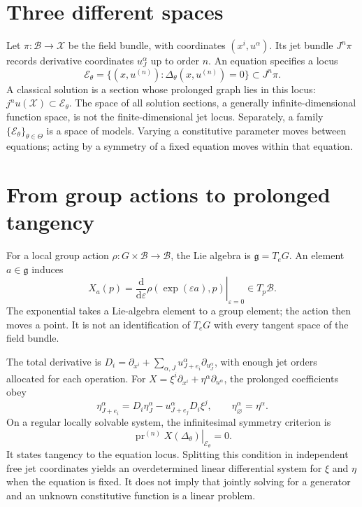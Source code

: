 \documentclass[11pt,a4paper,oneside]{report}
\numberwithin{equation}{chapter}
\newcommand{\E}{\mathcal E}
\newcommand{\dd}{\mathrm d}
\newcommand{\pr}{\operatorname{pr}}
\begin{document}
\section{Three different spaces}
Let $\pi:\mathcal B\to\mathcal X$ be the field bundle, with coordinates $(x^i,u^\alpha)$. Its jet bundle $J^n\pi$ records derivative coordinates $u^\alpha_J$ up to order $n$. An equation specifies a locus
\begin{equation}
\E_\theta=\{(x,u^{(n)}):\Delta_\theta(x,u^{(n)})=0\}\subset J^n\pi.
\end{equation}
A classical solution is a section whose prolonged graph lies in this locus: $j^nu(\mathcal X)\subset\E_\theta$. The space of all solution sections, a generally infinite-dimensional function space, is not the finite-dimensional jet locus. Separately, a family $\{\E_\theta\}_{\theta\in\Theta}$ is a space of models. Varying a constitutive parameter moves between equations; acting by a symmetry of a fixed equation moves within that equation.

\section{From group actions to prolonged tangency}
For a local group action $\rho:G\times\mathcal B\to\mathcal B$, the Lie algebra is $\mathfrak g=T_eG$. An element $a\in\mathfrak g$ induces
\begin{equation}
X_a(p)=\left.\frac{\dd}{\dd\varepsilon}\rho(\exp(\varepsilon a),p)\right|_{\varepsilon=0}\in T_p\mathcal B.
\end{equation}
The exponential takes a Lie-algebra element to a group element; the action then moves a point. It is not an identification of $T_eG$ with every tangent space of the field bundle.



The total derivative is $D_i=\partial_{x^i}+\sum_{\alpha,J}u^\alpha_{J+e_i}\partial_{u^\alpha_J}$, with enough jet orders allocated for each operation. For $X=\xi^i\partial_{x^i}+\eta^\alpha\partial_{u^\alpha}$, the prolonged coefficients obey
\begin{equation}\label{eq:prolong}
\eta^\alpha_{J+e_i}=D_i\eta^\alpha_J-u^\alpha_{J+e_j}D_i\xi^j,
\qquad \eta^\alpha_\varnothing=\eta^\alpha.
\end{equation}
On a regular locally solvable system, the infinitesimal symmetry criterion is \cite{olver1986,oliveri2026}
\begin{equation}\label{eq:criterion}
\left.\pr^{(n)}X(\Delta_\theta)\right|_{\E_\theta}=0.
\end{equation}
It states tangency to the equation locus. Splitting this condition in independent free jet coordinates yields an overdetermined linear differential system for $\xi$ and $\eta$ when the equation is fixed. It does not imply that jointly solving for a generator and an unknown constitutive function is a linear problem.
\end{document}
